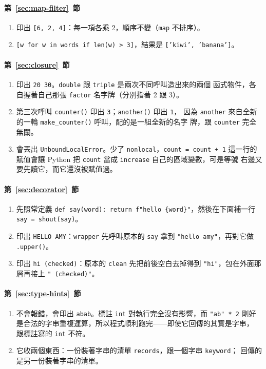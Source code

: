 \paragraph{第~\ref{sec:map-filter}~節}
\begin{enumerate}
\item 印出 \texttt{[6, 2, 4]}：每一項各乘 2，順序不變（\texttt{map} 不排序）。
\item \texttt{[w for w in words if len(w) > 3]}，結果是
\texttt{['kiwi', 'banana']}。
\end{enumerate}

\paragraph{第~\ref{sec:closure}~節}
\begin{enumerate}
\item 印出 \texttt{20 30}。\texttt{double} 跟 \texttt{triple} 是兩次不同呼叫造出來的兩個
函式物件，各自握著自己那張 \texttt{factor} 名字牌（分別指著 2 跟 3）。
\item 第三次呼叫 \texttt{counter()} 印出 \texttt{3}；\texttt{another()} 印出 \texttt{1}，
因為 \texttt{another} 來自全新的一輪 \texttt{make\_counter()} 呼叫，配的是一組全新的名字
牌，跟 \texttt{counter} 完全無關。
\item 會丟出 \texttt{UnboundLocalError}。少了 \texttt{nonlocal}，\texttt{count = count + 1}
這一行的賦值會讓 Python 把 \texttt{count} 當成 \texttt{increase} 自己的區域變數，可是等號
右邊又要先讀它，而它還沒被賦值過。
\end{enumerate}

\paragraph{第~\ref{sec:decorator}~節}
\begin{enumerate}
\item 先照常定義 \texttt{def say(word): return f"hello \{word\}"}，然後在下面補一行
\texttt{say = shout(say)}。
\item 印出 \texttt{HELLO AMY}：\texttt{wrapper} 先呼叫原本的 \texttt{say} 拿到
\texttt{"hello amy"}，再對它做 \texttt{.upper()}。
\item 印出 \texttt{hi (checked)}：原本的 \texttt{clean} 先把前後空白去掉得到
\texttt{"hi"}，包在外面那層再接上 \texttt{" (checked)"}。
\end{enumerate}

\paragraph{第~\ref{sec:type-hints}~節}
\begin{enumerate}
\item 不會報錯，會印出 \texttt{abab}。標註 \texttt{int} 對執行完全沒有影響，而
\texttt{"ab" * 2} 剛好是合法的字串重複運算，所以程式順利跑完——即使它回傳的其實是字串，
跟標註寫的 \texttt{int} 不符。
\item 它收兩個東西：一份裝著字串的清單 \texttt{records}，跟一個字串 \texttt{keyword}；
回傳的是另一份裝著字串的清單。
\end{enumerate}
